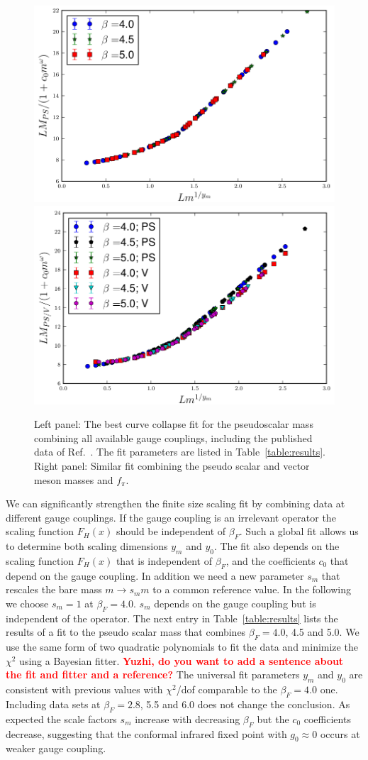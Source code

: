 \documentclass[aps,prl,twocolumn,]{revtex4}  %
\newcommand{\TODO}[1]{\textcolor{red}{{\bf #1}}}
\begin{document}
\begin{figure}[tbp]
\centering
  \includegraphics[width=0.45\linewidth]{pion_combined}\hfill
  \includegraphics[width=0.45\linewidth]{rho_combined}
  \caption{\label{fig:fss_combined} Left panel: The best curve collapse fit for the pseudoscalar mass combining  all available gauge couplings, including the published data of Ref.~\protect\cite{Fodor:2011tu,Aoki:2012eq}. The fit parameters are listed in Table~\protect\ref{table:results}. Right panel: Similar fit combining the pseudo scalar and  vector meson masses and $f_\pi$.  }
\end{figure}

We can significantly strengthen  the finite size scaling fit   by combining data at different gauge couplings. If the gauge coupling is an irrelevant operator the scaling function $F_H(x)$ should be independent of $\beta_F$. Such a global fit allows us to determine both  scaling dimensions  $y_m$ and $y_0$. The fit also depends on the  scaling function $F_H(x)$ that is  independent of $\beta_F$, and the coefficients $c_0$ that depend on the gauge coupling. In addition we need a new parameter $s_m$ that rescales the bare mass $m \to s_m m$ to a common reference value. In the following we choose $s_m=1$ at $\beta_F=4.0$. $s_m$ depends on the gauge coupling but is independent of the operator. The next entry in Table~\ref{table:results} lists the results of a fit to the pseudo scalar mass that combines $\beta_F=4.0$, 4.5 and 5.0. We use the same  form of two quadratic polynomials to fit the data and minimize the $\chi^2$ using a Bayesian fitter. \TODO{Yuzhi, do you want to add a sentence about the fit and fitter and a reference?}  The universal fit parameters $y_m$ and $y_0$ are consistent with previous values with $\chi^2$/dof  comparable to the   $\beta_F=4.0$ one. Including  data sets at $\beta_F=2.8$, 5.5 and 6.0 does not change the conclusion. As expected the  scale factors $s_m$ increase with decreasing $\beta_F$ but the $c_0$ coefficients decrease, suggesting that the conformal infrared fixed point with $g_0\approx 0$ occurs at weaker gauge coupling. 
\end{document}
